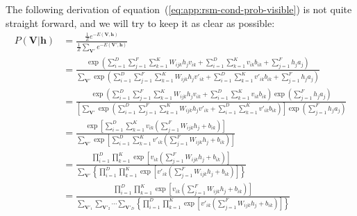 The following derivation of equation~(\ref{eq:app:rsm-cond-prob-visible}) is not quite straight forward, and we will try to keep it as clear as possible:
\begin{align}
    \label{eq:app:rsm-cond-prob-visible-init}
    P(\mathbf{V} | \mathbf{h}) &= \frac{\frac{1}{Z} e^{-E(\mathbf{V}, \mathbf{h})}}{\frac{1}{Z} \sum\limits_{\mathbf{V}'} e^{-E(\mathbf{V}', \mathbf{h})}} \\ %
    &= \frac{\exp{\left( \sum\limits^{D}_{i=1} \sum\limits^{F}_{j=1} \sum\limits^{K}_{k=1} W_{ijk} h_{j} v_{ik} + \sum\limits^{D}_{i=1} \sum\limits^{K}_{k=1} v_{ik} b_{ik} + \sum\limits^{F}_{j=1} h_{j} a_{j} \right)}}{\sum\limits_{\mathbf{V}'} \exp{\left( \sum\limits^{D}_{i=1} \sum\limits^{F}_{j=1} \sum\limits^{K}_{k=1} W_{ijk} h_{j} v'_{ik} + \sum\limits^{D}_{i=1} \sum\limits^{K}_{k=1} v'_{ik} b_{ik} + \sum\limits^{F}_{j=1} h_{j} a_{j}\right)}} \nonumber \\ %
    &= \frac{\exp{\left( \sum\limits^{D}_{i=1} \sum\limits^{F}_{j=1} \sum\limits^{K}_{k=1} W_{ijk} h_{j} v_{ik} + \sum\limits^{D}_{i=1} \sum\limits^{K}_{k=1} v_{ik} b_{ik}\right) \exp{\left( \sum\limits^{F}_{j=1} h_{j} a_{j}\right)}}}{\left[ \sum\limits_{\mathbf{V}'} \exp{\left( \sum\limits^{D}_{i=1} \sum\limits^{F}_{j=1} \sum\limits^{K}_{k=1} W_{ijk} h_{j} v'_{ik} + \sum\limits^{D}_{i=1} \sum\limits^{K}_{k=1} v'_{ik} b_{ik}\right)}\right] \exp{\left( \sum\limits^{F}_{j=1} h_{j} a_{j}\right)}} \nonumber \\ %
    &= \frac{\exp{\left[ \sum\limits^{D}_{i=1} \sum\limits^{K}_{k=1} v_{ik} \left( \sum\limits^{F}_{j=1} W_{ijk} h_{j} + b_{ik}\right)\right]}}{\sum\limits_{\mathbf{V}'} \exp{\left[ \sum\limits^{D}_{i=1} \sum\limits^{K}_{k=1} v'_{ik} \left( \sum\limits^{F}_{j=1} W_{ijk} h_{j} + b_{ik}\right)\right]}} \nonumber \\ %
    &= \frac{\prod\limits^{D}_{i=1} \prod\limits^{K}_{k=1} \exp{\left[ v_{ik} \left( \sum\limits^{F}_{j=1} W_{ijk} h_{j} + b_{ik}\right)\right]}}{\sum\limits_{\mathbf{V}'} \left\{ \prod\limits^{D}_{i=1} \prod\limits^{K}_{k=1} \exp{\left[ v'_{ik} \left( \sum\limits^{F}_{j=1} W_{ijk} h_{j} + b_{ik}\right)\right]}\right\}} \nonumber \\ %
    &= \frac{\prod\limits^{D}_{i=1} \prod\limits^{K}_{k=1} \exp{\left[ v_{ik} \left( \sum\limits^{F}_{j=1} W_{ijk} h_{j} + b_{ik}\right)\right]}}{\sum\limits_{\mathbf{V}'_{1}} \sum\limits_{\mathbf{V}'_{2}} \cdots \sum\limits_{\mathbf{V}'_{D}} \left\{ \prod\limits^{D}_{i=1} \prod\limits^{K}_{k=1} \exp{\left[ v'_{ik} \left( \sum\limits^{F}_{j=1} W_{ijk} h_{j} + b_{ik}\right)\right]}\right\}} \nonumber \\ %

\end{align}
